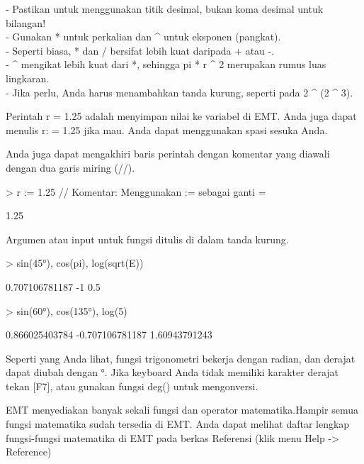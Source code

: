 \documentclass[a4paper,10pt]{article}
\begin{document}
\begin{eulernotebook}
\begin{eulercomment}
\begin{eulercomment}
\begin{eulercomment}
- Pastikan untuk menggunakan titik desimal, bukan koma desimal untuk
bilangan!\\
- Gunakan * untuk perkalian dan \textasciicircum{} untuk eksponen (pangkat).\\
- Seperti biasa, * dan / bersifat lebih kuat daripada + atau -.\\
- \textasciicircum{} mengikat lebih kuat dari *, sehingga pi * r \textasciicircum{} 2 merupakan rumus
luas lingkaran.\\
- Jika perlu, Anda harus menambahkan tanda kurung, seperti pada 2 \textasciicircum{} (2
\textasciicircum{} 3).

Perintah r = 1.25 adalah menyimpan nilai ke variabel di EMT. Anda juga
dapat menulis r: = 1.25 jika mau. Anda dapat menggunakan spasi sesuka
Anda.

Anda juga dapat mengakhiri baris perintah dengan komentar yang diawali
dengan dua garis miring (//).
\end{eulercomment}
\begin{eulerprompt}
> r := 1.25 // Komentar: Menggunakan := sebagai ganti =
\end{eulerprompt}
\begin{euleroutput}
  1.25
\end{euleroutput}
\begin{eulercomment}
Argumen atau input untuk fungsi ditulis di dalam tanda kurung.
\end{eulercomment}
\begin{eulerprompt}
> sin(45°), cos(pi), log(sqrt(E))
\end{eulerprompt}
\begin{euleroutput}
  0.707106781187
  -1
  0.5
\end{euleroutput}
\begin{eulerprompt}
> sin(60°), cos(135°), log(5)
\end{eulerprompt}
\begin{euleroutput}
  0.866025403784
  -0.707106781187
  1.60943791243
\end{euleroutput}
\begin{eulercomment}
Seperti yang Anda lihat, fungsi trigonometri bekerja dengan radian,
dan derajat dapat diubah dengan °. Jika keyboard Anda tidak memiliki
karakter derajat tekan [F7], atau gunakan fungsi deg() untuk
mengonversi.

EMT menyediakan banyak sekali fungsi dan operator matematika.Hampir
semua fungsi matematika sudah tersedia di EMT. Anda dapat melihat
daftar lengkap fungsi-fungsi matematika di EMT pada berkas Referensi
(klik menu Help -\textgreater{} Reference)


\end{eulercomment}
\end{eulercomment}
\end{eulercomment}
\end{eulernotebook}
\end{document}
